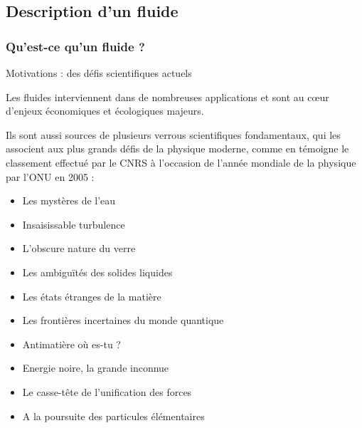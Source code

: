 \subsection{Description d'un fluide}

\subsubsection{Qu'est-ce qu'un fluide ?}


\begin{frame}{Motivations : des défis scientifiques actuels}

\small

Les fluides interviennent dans de nombreuses applications et sont au c{\oe}ur d'enjeux économiques 
et écologiques majeurs.

\medskip

Ils sont aussi sources de plusieurs verrous scientifiques fondamentaux, qui les associent 
aux plus grands défis de la physique moderne, comme en témoigne le classement effectué 
par le CNRS à l'occasion de l'année mondiale de la physique par l'ONU en 2005 :

\medskip

\begin{itemize}
\item \textcolor{vert}{Les mystères de l'eau}
\item \textcolor{rouge}{Insaisissable turbulence}
\item \textcolor{vert}{L'obscure nature du verre}
\item \textcolor{rouge}{Les ambiguïtés des solides liquides}
\item Les états étranges de la matière
\item Les frontières incertaines du monde quantique
\item Antimatière o{\`u} es-tu ?
\item Energie noire, la grande inconnue
\item Le casse-tête de l'unification des forces
\item A la poursuite des particules élémentaires
\end{itemize}

\end{frame}

